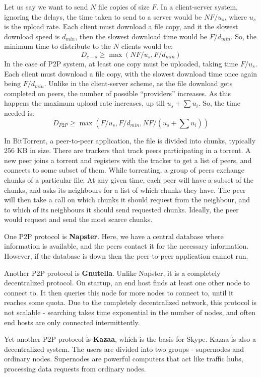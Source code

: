 \documentclass[12pt,letterpaper]{amsbook}
\theoremstyle{definition}
\begin{document}
Let us say we want to send $N$ file copies of size $F$. In a client-server system, ignoring the delays, the time taken to send to a server would be $NF/u_s$, where $u_s$ is the upload rate. Each client must download a file copy, and it the slowest download speed is $d_{min}$, then the slowest download time would be $F/d_{min}$. So, the minimum time to distribute to the $N$ clients would be:
\[D_{c-s} \geq \max(NF/u_s,F/d_{min})\]
In the case of P2P system, at least one copy must be uploaded, taking time $F/u_s$. Each client must download a file copy, with the slowest download time once again being $F/d_{min}$. Unlike in the client-server scheme, as the file download gets completed on peers, the number of possible ``providers'' increases. As this happens the maximum upload rate increases, up till $u_s +\sum u_i$. So, the time needed is:
\[D_{P2P} \geq \max(F/u_s,F/d_{min},NF/(u_s+ \sum u_i))\]

In BitTorrent, a peer-to-peer application, the file is divided into chunks, typically 256 KB in size. There are trackers that track peers participating in a torrent. A new peer joins a torrent and registers with the tracker to get a list of peers, and connects to some subset of them. While torrenting, a group of peers exchange chunks of a particular file. At any given time, each peer will have a subset of the chunks, and asks its neighbours for a list of which chunks they have. The peer will then take a call on which chunks it should request from the neighbour, and to which of its neighbours it should send requested chunks. Ideally, the peer would request and send the most scarce chunks.

One P2P protocol is \textbf{Napster}. Here, we have a central database where information is available, and the peers contact it for the necessary information. However, if the database is down then the peer-to-peer application cannot run.

Another P2P protocol is \textbf{Gnutella}. Unlike Napster, it is a completely decentralized protocol. On startup, an end host finds at least one other node to connect to. It then queries this node for more nodes to connect to, until it reaches some quota. Due to the completely decentralized network, this protocol is not scalable - searching takes time exponential in the number of nodes, and often end hosts are only connected intermittently.

Yet another P2P protocol is \textbf{Kazaa}, which is the basis for Skype. Kazaa is also a decentralized system. The users are divided into two groups - supernodes and ordinary nodes. Supernodes are powerful computers that act like traffic hubs, processing data requests from ordinary nodes.
\end{document}
